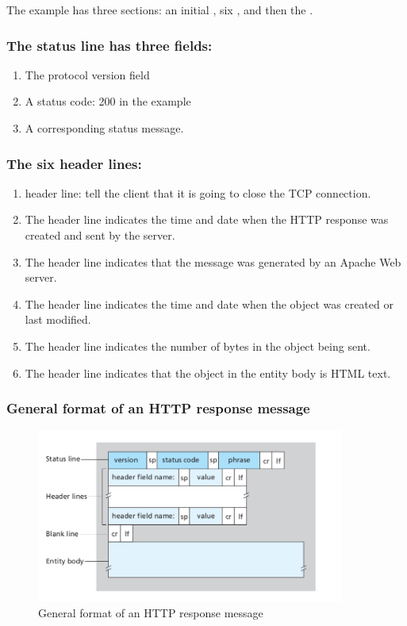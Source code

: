 The example has three sections: an initial , six , and then the .\\
\subsubsection{The status line has three fields:}

\begin{enumerate}
    \item The protocol version field
    \item A status code: 200 in the example
    \item A corresponding status message.
\end{enumerate}

\subsubsection{The six header lines:}

\begin{enumerate}
    \item {} header line: tell the client that it is going to close the TCP connection.
    \item The  header line indicates the time and date when the HTTP response was created and sent by the server.
    \item The  header line indicates that the message was generated by an Apache Web server.
    \item The  header line indicates the time and date when the object was created or last modified.
    \item The  header line indicates the number of bytes in the object being sent.
    \item The  header line indicates that the object in the entity body is HTML text.
\end{enumerate}


\subsubsection{General format of an HTTP response message}

\begin{figure}[!h]
    \centering
    \includegraphics[width=0.9\textwidth]{chapters/chapter2/HTTP_Reponse_Message.png}
    \caption{General format of an HTTP response message}
    \label{c2_http_response}
\end{figure}

